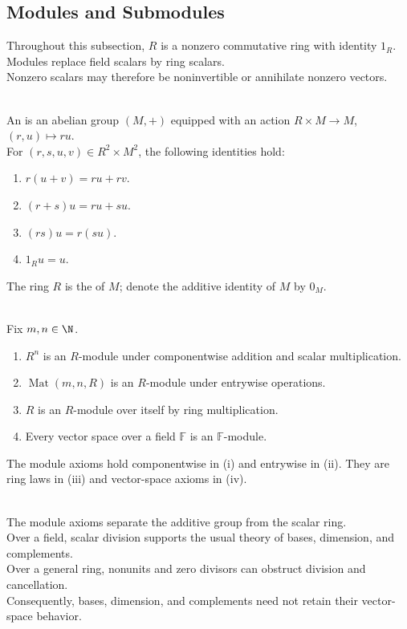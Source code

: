 \subsection{Modules and Submodules}

Throughout this subsection, $R$ is a nonzero commutative ring with identity $1_R$.\\
Modules replace field scalars by ring scalars.\\
Nonzero scalars may therefore be noninvertible or annihilate nonzero vectors.

\begin{definition} \label{def:module-over-ring} \\
An  is an abelian group $(M,+)$ equipped with an action $R\times M\to M$, $(r,u)\mapsto ru$.\\
For $(r,s,u,v)\in R^2\times M^2$, the following identities hold:
\begin{enumerate}[label=(\roman*)]
\setlength{\itemsep}{0pt}
\item $r(u+v)=ru+rv$.
\item $(r+s)u=ru+su$.
\item $(rs)u=r(su)$.
\item $1_Ru=u$.
\end{enumerate}
The ring $R$ is the  of $M$; denote the additive identity of $M$ by $0_M$.
\end{definition}

\begin{example} \label{ex:basic-module-models} \\
Fix $m,n\in\N$.
\begin{enumerate}[label=(\roman*)]
\setlength{\itemsep}{0pt}
\item $R^n$ is an $R$-module under componentwise addition and scalar multiplication.
\item $\operatorname{Mat}(m,n,R)$ is an $R$-module under entrywise operations.
\item $R$ is an $R$-module over itself by ring multiplication.
\item Every vector space over a field $\mathbb{F}$ is an $\mathbb{F}$-module.
\end{enumerate}
The module axioms hold componentwise in (i) and entrywise in (ii). They are ring laws in (iii) and vector-space axioms in (iv).
\end{example}

\begin{perspective} \label{per:base-ring-controls-modules} \\
The module axioms separate the additive group from the scalar ring.\\
Over a field, scalar division supports the usual theory of bases, dimension, and complements.\\
Over a general ring, nonunits and zero divisors can obstruct division and cancellation.\\
Consequently, bases, dimension, and complements need not retain their vector-space behavior.
\end{perspective}

